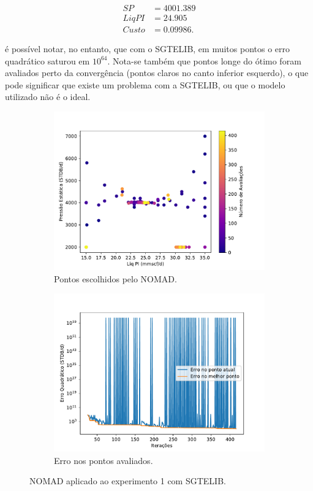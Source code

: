 \begin{align*}
SP&= 4001.389 \\
Liq PI &= 24.905 \\
Custo &= 0.09986.
\end{align*}

é possível notar, no entanto, que com o SGTELIB, em muitos pontos o erro quadrático saturou em $10^{64}$. Nota-se também que pontos longe do ótimo foram avaliados perto da convergência (pontos claros no canto inferior esquerdo), o que pode significar que existe um problema com a SGTELIB, ou que o modelo utilizado não é o ideal.

\begin{figure}
\centering
\begin{subfigure}{0.5\textwidth}
  \centering
  \includegraphics[width=1\linewidth]{figs/setup1sgtelib_eval_points.pdf}
  \caption{Pontos escolhidos pelo NOMAD.}
  \label{fig:setup2_points}
\end{subfigure}%
\begin{subfigure}{0.5\textwidth}
  \centering
  \includegraphics[width=1\linewidth]{figs/setup1sgtelib_errors.pdf}
  \caption{Erro nos pontos avaliados.}
  \label{fig:setup2_error}
\end{subfigure}
\caption{NOMAD aplicado ao experimento 1 com SGTELIB.}
\label{fig:setup2_2}
\end{figure}



